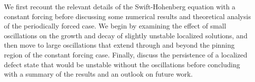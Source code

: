 \documentclass[../main/TimeForcingSHE.tex]{subfiles}
\begin{document}
We first recount the relevant details of the Swift-Hohenberg equation with a constant forcing before discussing some numerical results and theoretical analysis of the periodically forced case.   We begin by examining the  effect of small oscillations on the growth and decay of slightly  unstable localized solutions, and then move to large oscillations that extend through and beyond the pinning region of the constant forcing case.  Finally, discuss the persistence of a localized defect state that would be unstable without the oscillations before concluding with a summary of the results and an outlook on future work.




\end{document}
